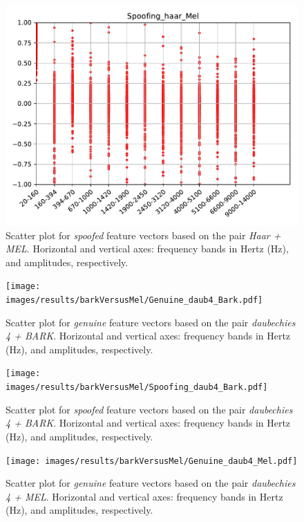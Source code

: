 		\begin{figure}[H]
			\centering
			\includegraphics[scale=.7]{images/results/barkVersusMel/Spoofing_haar_Mel.pdf}
			\caption{Scatter plot for \textit{spoofed} feature vectors based on the pair \textit{Haar + MEL}. Horizontal and vertical axes: frequency bands in Hertz (Hz), and amplitudes, respectively.}
			\label{fig:spoofinghaarmel}
		\end{figure}
		\begin{figure}[H]
			\centering
			\texttt{[image: images/results/barkVersusMel/Genuine\_daub4\_Bark.pdf]}
			\caption{Scatter plot for \textit{genuine} feature vectors based on the pair \textit{daubechies 4 + BARK}. Horizontal and vertical axes: frequency bands in Hertz (Hz), and amplitudes, respectively.}
			\label{fig:livedaub4bark}
		\end{figure}
		\begin{figure}[H]
			\centering
			\texttt{[image: images/results/barkVersusMel/Spoofing\_daub4\_Bark.pdf]}
			\caption{Scatter plot for \textit{spoofed} feature vectors based on the pair \textit{daubechies 4 + BARK}. Horizontal and vertical axes: frequency bands in Hertz (Hz), and amplitudes, respectively.}
			\label{fig:spoofingdaub4bark}
		\end{figure}
		\begin{figure}[H]
			\centering
			\texttt{[image: images/results/barkVersusMel/Genuine\_daub4\_Mel.pdf]}
			\caption{Scatter plot for \textit{genuine} feature vectors  based on the pair \textit{daubechies 4 + MEL}. Horizontal and vertical axes: frequency bands in Hertz (Hz), and amplitudes, respectively.}
			\label{fig:livedaub4mel}
		\end{figure}
